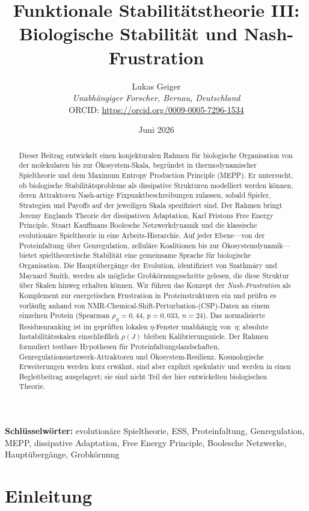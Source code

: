 \documentclass[12pt,a4paper]{article}
\title{Funktionale Stabilitätstheorie III: Biologische Stabilität und Nash-Frustration}
\author{Lukas Geiger\\
\textit{Unabhängiger Forscher, Bernau, Deutschland}\\
ORCID: \url{https://orcid.org/0009-0005-7296-1534}}
\date{Juni 2026}
\theoremstyle{remark}
\begin{document}
\maketitle

\begin{abstract}
Dieser Beitrag entwickelt einen konjekturalen Rahmen für biologische Organisation von der molekularen bis zur Ökosystem-Skala, begründet in thermodynamischer Spieltheorie und dem Maximum Entropy Production Principle (MEPP). Er untersucht, ob biologische Stabilitätsprobleme als dissipative Strukturen modelliert werden können, deren Attraktoren Nash-artige Fixpunktbeschreibungen zulassen, sobald Spieler, Strategien und Payoffs auf der jeweiligen Skala spezifiziert sind. Der Rahmen bringt Jeremy Englands Theorie der dissipativen Adaptation, Karl Fristons Free Energy Principle, Stuart Kauffmans Boolesche Netzwerkdynamik und die klassische evolutionäre Spieltheorie in eine Arbeits-Hierarchie. Auf jeder Ebene---von der Proteinfaltung über Genregulation, zelluläre Koalitionen bis zur Ökosystemdynamik---bietet spieltheoretische Stabilität eine gemeinsame Sprache für biologische Organisation. Die Hauptübergänge der Evolution, identifiziert von Szathm\'ary und Maynard Smith, werden als mögliche Grobkörnungsschritte gelesen, die diese Struktur über Skalen hinweg erhalten können. Wir führen das Konzept der \emph{Nash-Frustration} als Komplement zur energetischen Frustration in Proteinstrukturen ein und prüfen es vorläufig anhand von NMR-Chemical-Shift-Perturbation-(CSP)-Daten an einem einzelnen Protein (Spearman $\rho_S = 0{,}44$, $p = 0{,}033$, $n = 24$). Das normalisierte Residuenranking ist im geprüften lokalen $\eta$-Fenster unabhängig von~$\eta$; absolute Instabilitätsskalen einschließlich $\rho(J)$ bleiben Kalibrierungsziele. Der Rahmen formuliert testbare Hypothesen für Proteinfaltungslandschaften, Genregulationsnetzwerk-Attraktoren und Ökosystem-Resilienz. Kosmologische Erweiterungen werden kurz erwähnt, sind aber explizit spekulativ und werden in einen Begleitbeitrag ausgelagert; sie sind nicht Teil der hier entwickelten biologischen Theorie.
\end{abstract}

\textbf{Schlüsselwörter:} evolutionäre Spieltheorie, ESS, Proteinfaltung, Genregulation, MEPP, dissipative Adaptation, Free Energy Principle, Boolesche Netzwerke, Hauptübergänge, Grobkörnung

\clearpage

\section{Einleitung}
\label{sec:introduction}
\end{document}
